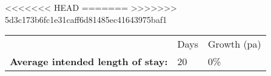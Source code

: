 <<<<<<< HEAD
=======
>>>>>>> 5d3c173b6fc1e31caff6d81485ec41643975baf1
\begin{tabular}[t]{p{4.45cm}>{\hfill}p{1.3cm}>{\hfill}p{1.7cm}}
   & Days & Growth (pa) \\ 
 \textbf{Average intended length of stay:} & 20 & 0\% \\ 
  \end{tabular}
